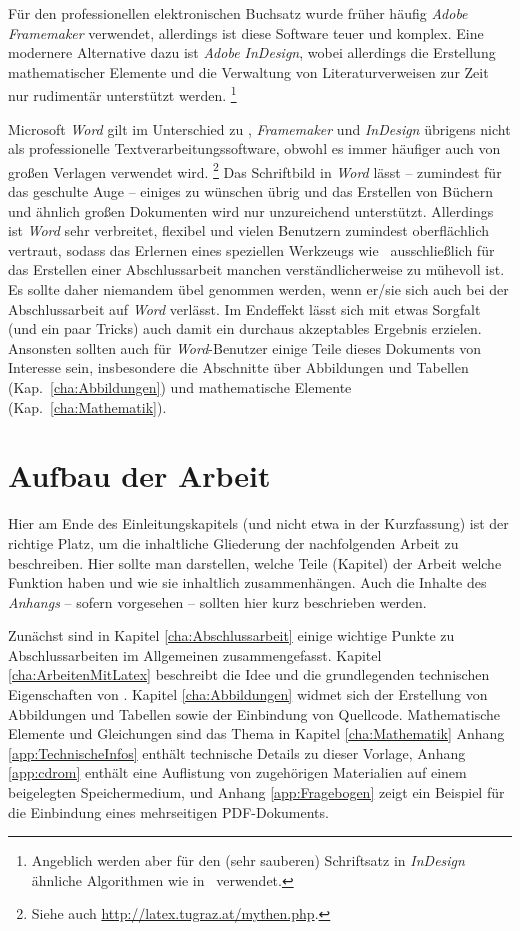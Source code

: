 Für den professionellen elektronischen Buchsatz wurde früher
häufig \emph{Adobe Framemaker} verwendet, allerdings ist diese
Software teuer und komplex. Eine modernere Alternative dazu ist
\emph{Adobe InDesign}, wobei allerdings die Erstellung
mathematischer Elemente und die Verwaltung von Literaturverweisen
zur Zeit nur rudimentär unterstützt werden.%
\footnote{Angeblich werden aber für den (sehr sauberen) Schriftsatz 
in \emph{InDesign} ähnliche Algorithmen wie in \latex\ verwendet.}

Microsoft \emph{Word} gilt im Unterschied zu \latex, 
\emph{Framemaker} und \emph{InDesign} übrigens nicht als professionelle
Textverarbeitungssoftware, obwohl es immer häufiger auch von
großen Verlagen verwendet wird.%
\footnote{Siehe auch \url{http://latex.tugraz.at/mythen.php}.}
Das Schriftbild in \emph{Word}
lässt -- zumindest für das geschulte Auge -- einiges zu wünschen
übrig und das Erstellen von Büchern und ähnlich großen Dokumenten
wird nur unzureichend unterstützt. Allerdings ist \emph{Word} sehr
verbreitet, flexibel und vielen Benutzern zumindest oberflächlich
vertraut, sodass das Erlernen eines speziellen Werkzeugs wie
\latex\ ausschließlich für das Erstellen einer Abschlussarbeit
manchen verständlicherweise zu mühevoll ist. Es sollte daher
niemandem übel genommen werden, wenn er/sie sich auch bei der Abschlussarbeit
auf \emph{Word} verlässt. Im Endeffekt lässt sich mit etwas
Sorgfalt (und ein paar Tricks) auch damit ein durchaus akzeptables
Ergebnis erzielen. 
Ansonsten sollten auch für \emph{Word}-Benutzer 
einige Teile dieses Dokuments von Interesse sein, insbesondere die
Abschnitte über Abbildungen und Tabellen
(Kap.~\ref{cha:Abbildungen}) und mathematische Elemente
(Kap.~\ref{cha:Mathematik}).


\section{Aufbau der Arbeit}

Hier am Ende des Einleitungskapitels (und nicht
etwa in der Kurzfassung) ist der richtige Platz, um die
inhaltliche Gliederung der nachfolgenden Arbeit zu beschreiben.
Hier sollte man darstellen, welche Teile (Kapitel) der Arbeit
welche Funktion haben und wie sie inhaltlich zusammenhängen. Auch
die Inhalte des \emph{Anhangs} -- sofern vorgesehen -- sollten hier
kurz beschrieben werden.

Zunächst sind in Kapitel \ref{cha:Abschlussarbeit} einige wichtige
Punkte zu Abschlussarbeiten im Allgemeinen zusammengefasst.
Kapitel \ref{cha:ArbeitenMitLatex} beschreibt die Idee und die
grundlegenden technischen Eigenschaften von \latex.
Kapitel \ref{cha:Abbildungen} widmet sich der Erstellung von Abbildungen
und Tabellen sowie der Einbindung von Quellcode.
Mathematische Elemente und Gleichungen sind das Thema in Kapitel \ref{cha:Mathematik} 
\usw
Anhang \ref{app:TechnischeInfos} enthält technische Details zu
dieser Vorlage, 
Anhang \ref{app:cdrom} enthält eine Auflistung von zugehörigen Materialien
auf einem beigelegten Speichermedium, und 
Anhang \ref{app:Fragebogen} zeigt ein Beispiel für die
Einbindung eines mehrseitigen PDF-Dokuments.






